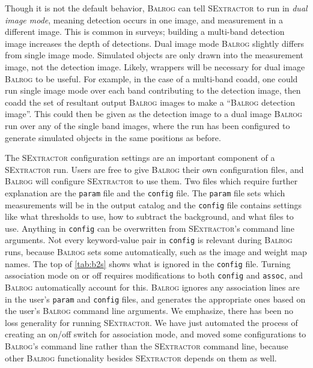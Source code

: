\documentclass[11pt]{book}
\newcommand{\balrog}{\textsc{Balrog}}
\newcommand{\sex}{\textsc{SExtractor}}
\begin{document}
\hypertarget{hyper:dual}{}
Though it is not the default behavior, \balrog{} can tell \sex{} to run in \textit{dual image mode},
meaning detection occurs in one image, and measurement in a different image.
This is common in surveys; building a multi-band detection image increases the depth of detections. 
Dual image mode \balrog{} slightly differs from single image mode.
Simulated objects are only drawn into the measurement image, not the detection image.
Likely, wrappers will be necessary for dual image \balrog{} to be useful.
For example, in the case of a multi-band coadd, one could run single image mode over each band contributing to the detection image, 
then coadd the set of resultant output \balrog{} images to make a ``\balrog{} detection image''.
This could then be given as the detection image to a dual image \balrog{} run over any of the single band images,
where the run has been configured to generate simulated objects in the same positions as before.

\hypertarget{hyper:sexfiles}{}
The \sex{} configuration settings are an important component of a \sex{} run.
Users are free to give \balrog{} their own configuration files, and \balrog{} will configure \sex{} to use them.
Two files which require further explanation are the \texttt{param} file and the \texttt{config} file.
The \texttt{param} file sets which measurements will be in the output catalog and the \texttt{config} file
contains settings like what thresholds to use, how to subtract the background, and what files to use.
Anything in \texttt{config} can be overwritten from \sex{}'s command line arguments.
Not every keyword-value pair in \texttt{config} is relevant during \balrog{} runs,
because \balrog{} sets some automatically, such as the image and weight map names.
The top of \autoref{tab:b2s} shows what is ignored in the \texttt{config} file.
Turning association mode on or off requires modifications to both \texttt{config} and \texttt{assoc},
and \balrog{} automatically account for this.
\balrog{} ignores any association lines are in the user's \texttt{param} and \texttt{config} files,
and generates the appropriate ones based on the user's \balrog{} command line arguments.
We emphasize, there has been no loss generality for running \sex{}.
We have just automated the process of creating an on/off switch for association mode, and moved some
configurations to \balrog{}'s command line rather than the \sex{} command line,
because other \balrog{} functionality besides \sex{} depends on them as well.
\end{document}
